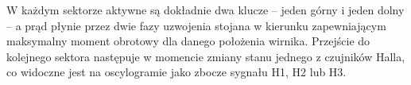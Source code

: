 \documentclass[12pt]{article}
\begin{document}
W każdym sektorze aktywne są dokładnie dwa klucze -- jeden górny 
i jeden dolny -- a prąd płynie przez dwie fazy uzwojenia stojana 
w kierunku zapewniającym maksymalny moment obrotowy dla danego 
położenia wirnika. Przejście do kolejnego sektora następuje 
w momencie zmiany stanu jednego z czujników Halla, co widoczne 
jest na oscylogramie jako zbocze sygnału H1, H2 lub H3.
\end{document}
